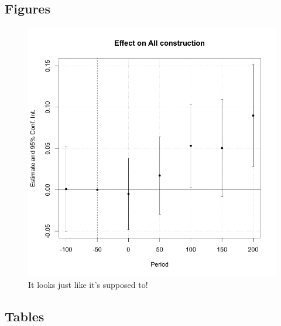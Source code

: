 \documentclass[11pt, a4paper]{article}
\begin{document}
\subsection*{Figures}

\begin{figure}[ht]
    \centering
    \includegraphics[scale = 0.4]{paper/output/regressions/SW22_replication_50y.png}
    \caption{It looks just like it's supposed to!}
    \label{fig:SW_replication}
\end{figure}

\clearpage
\subsection*{Tables}






\end{document}
